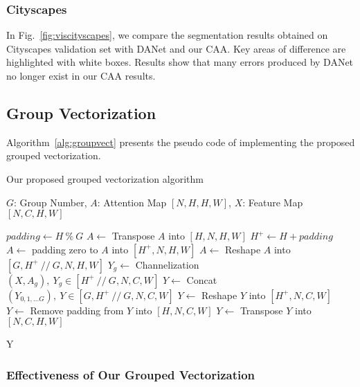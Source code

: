 \documentclass[letterpaper]{article} \usepackage{aaai22}  \usepackage{times}  \usepackage{helvet}  \usepackage{courier}  \usepackage[hyphens]{url}  \usepackage{graphicx} \urlstyle{rm} \def\UrlFont{\rm}  \usepackage{natbib}  \usepackage{caption} \DeclareCaptionStyle{ruled}{labelfont=normalfont,labelsep=colon,strut=off} \frenchspacing  \setlength{\pdfpagewidth}{8.5in}  \setlength{\pdfpageheight}{11in}  \usepackage{algorithm}
\begin{document}
\subsubsection{Cityscapes} In Fig.~\ref{fig:viscityscapes}, we compare the segmentation results obtained on Cityscapes validation set with DANet and our CAA. 
Key areas of difference are highlighted with white boxes. 
Results show that many errors produced by DANet no longer exist in our CAA results.



\subsection{Group Vectorization}

Algorithm~\ref{alg:groupvect} presents the pseudo code of implementing the proposed grouped vectorization. 

\begin{algorithm}[t]
    \small
    \setlength{\abovecaptionskip}{0.1cm}
    \setlength{\belowcaptionskip}{0.1cm}

    \caption{Our proposed grouped vectorization algorithm}

    \begin{algorithmic}[1]
        \Require $G$: Group Number, $A$: Attention Map $[N, H, H, W]$, $X$: Feature Map $[N, C, H, W]$
        
        \State $padding \gets H\:\%\:G$
        \State $A\gets$ Transpose $A$ into $ [H, N, H, W] $
        \State $H^{+} \gets H + padding$
        \State $A\gets$ padding zero to  $A$ into $[H^{+}, N, H, W]$
        \State $A\gets$ Reshape $A$ into $[G, H^{+}\://\:G, N, H, W]$
            \State $Y_{g}\gets$ Channelization $(X, A_{g}),\:Y_{g}\in[H^{+}\://\:G, N, C, W]$
        \EndFor
        \State $Y\gets$ Concat$(Y_{0,1,...G}),\:Y\in[G, H^{+}\://\:G, N, C, W]$
        \State $Y\gets$ Reshape  $Y$ into $[H^{+}, N, C, W]$
        \State $Y\gets$ Remove padding from $Y$ into $[H, N, C, W]$
        \State $Y\gets$ Transpose $Y$ into $[N, C, H, W]$
        
        \Return Y
    \end{algorithmic}
    \label{alg:groupvect}
\end{algorithm}

\subsubsection{Effectiveness of Our Grouped Vectorization}
\end{document}
